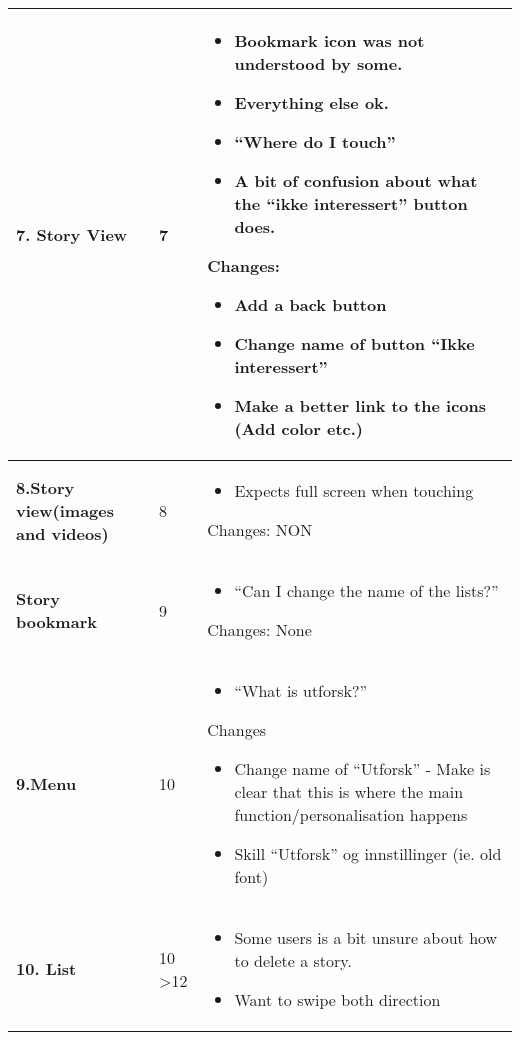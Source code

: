 \begin{center}
\begin{longtable}{ | p{4cm} | p{3cm} | p{9cm}|}
		\textbf{7. Story View} & 7 & 
		\begin{itemize}
			\item Bookmark icon was not understood by some.
			\item Everything else ok.
			\item “Where do I touch”
			\item A bit of confusion about what the “ikke interessert” button does.
		\end{itemize}
		Changes:
		\begin{itemize}
			\item Add a back button
			\item Change name of button “Ikke interessert”
			\item Make a better link to the icons (Add color etc.)
		\end{itemize}
		\\\hline
		
		\textbf{8.Story view(images and videos)} & 8 & 
		\begin{itemize}
			\item 	Expects full screen when touching
		\end{itemize}
		
		
		Changes:
		NON
		\\\hline
		\textbf{Story bookmark} & 9  & 
		\begin{itemize}
			\item “Can I change the name of the lists?”
		\end{itemize}
		
		Changes: None	
		\\\hline
		\textbf{9.Menu} & 10  &
		\begin{itemize}
			\item “What is utforsk?” 
		\end{itemize}
		Changes
		\begin{itemize}
			\item Change name of “Utforsk” - Make is clear that this is where the main function/personalisation happens  		 	
			\item Skill “Utforsk” og innstillinger (ie. old font)
		\end{itemize}			
		\\\hline
		\textbf{10. List} & 10 \textgreater 12 &
		\begin{itemize}
			\item Some users is a bit unsure about how to delete a story.
			\item Want to swipe both direction
		\end{itemize} 
		

\end{longtable}
\end{center}
